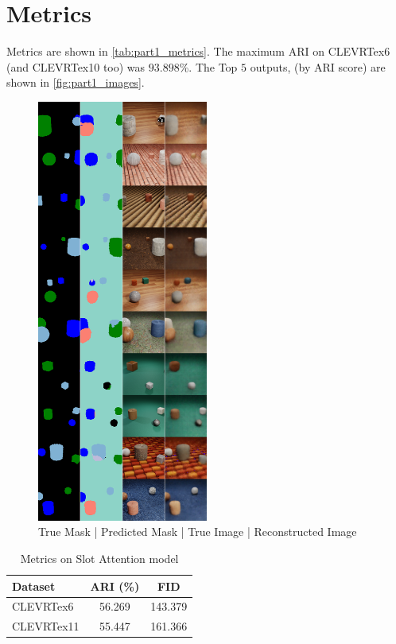 \section{Metrics}
Metrics are shown in \autoref{tab:part1_metrics}. The
maximum ARI on CLEVRTex6 (and CLEVRTex10 too) was $93.898$\%. The Top $5$ outputs, (by ARI score) are shown in \autoref{fig:part1_images}. 
\begin{figure}[hbt!]
  \centering
  \includegraphics[width=0.5\textwidth]{images/result_images.png} 
  \caption{True Mask | Predicted Mask | True Image | Reconstructed Image}
  \label{fig:part1_images}
\end{figure}

\begin{table}[h]
\centering
\begin{tabular}{lcc}
\toprule
Dataset & ARI (\%) & FID \\
\midrule
CLEVRTex6 &56.269&  143.379\\
CLEVRTex11 &55.447 & 161.366\\
\bottomrule
\end{tabular}
\caption{Metrics on Slot Attention model}
\label{tab:part1_metrics}
\end{table}

